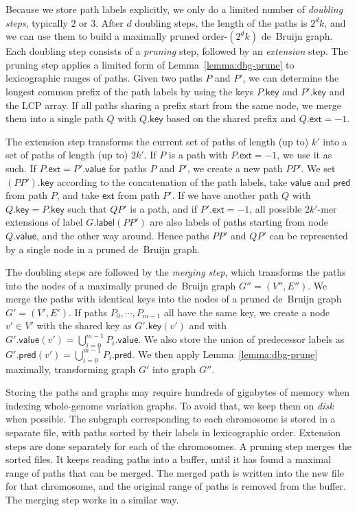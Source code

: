 \documentclass[twoside,leqno,twocolumn]{article}
\newcommand{\glabel}{\ensuremath{\mathsf{label}}}
\newcommand{\gpred}{\ensuremath{\mathsf{pred}}}
\newcommand{\gkey}{\ensuremath{\mathsf{key}}}
\newcommand{\gvalue}{\ensuremath{\mathsf{value}}}
\newcommand{\gext}{\ensuremath{\mathsf{ext}}}
\newcommand{\kmer}[1]{$#1$\nobreakdash-mer}
\newcommand{\orderk}[1]{order\nobreakdash-$#1$}
\begin{document}
Because we store path labels explicitly, we only do a limited number of \emph{doubling steps}, typically $2$ or $3$. After $d$ doubling steps, the length of the paths is $2^{d} k$, and we can use them to build a maximally pruned \orderk{(2^{d} k)} de~Bruijn graph. Each doubling step consists of a \emph{pruning} step, followed by an \emph{extension} step. The pruning step applies a limited form of Lemma~\ref{lemma:dbg-prune} to lexicographic ranges of paths. Given two paths $P$ and $P'$, we can determine the longest common prefix of the path labels by using the keys $P.\gkey$ and $P'.\gkey$ and the LCP array. If all paths sharing a prefix start from the same node, we merge them into a single path $Q$ with $Q.\gkey$ based on the shared prefix and $Q.\gext = -1$.

The extension step transforms the current set of paths of length (up to) $k'$ into a set of paths of length (up to) $2k'$. If $P$ is a path with $P.\gext = -1$, we use it as such. If $P.\gext = P'.\gvalue$ for paths $P$ and $P'$, we create a new path $PP'$. We set $(PP').\gkey$ according to the concatenation of the path labels, take $\gvalue$ and $\gpred$ from path $P$, and take $\gext$ from path $P'$. If we have another path $Q$ with $Q.\gkey = P.\gkey$ such that $QP'$ is a path, and if $P'.\gext = -1$, all possible \kmer{2k'} extensions of label $G.\glabel(PP')$ are also labels of paths starting from node $Q.\gvalue$, and the other way around. Hence paths $PP'$ and $QP'$ can be represented by a single node in a pruned de~Bruijn graph.

The doubling steps are followed by the \emph{merging step}, which transforms the paths into the nodes of a maximally pruned de~Bruijn graph $G'' = (V'', E'')$. We merge the paths with identical keys into the nodes of a pruned de~Bruijn graph $G' = (V', E')$. If paths $P_{0}, \dotsm, P_{m-1}$ all have the same key, we create a node $v' \in V'$ with the shared key as $G'.\gkey(v')$ and with $G'.\gvalue(v') = \bigcup_{i=0}^{m-1} P_{i}.\gvalue$. We also store the union of predecessor labels as $G'.\gpred(v') = \bigcup_{i=0}^{m-1} P_{i}.\gpred$. We then apply Lemma~\ref{lemma:dbg-prune} maximally, transforming graph $G'$ into graph $G''$.

Storing the paths and graphs may require hundreds of gigabytes of memory when indexing whole-genome variation graphs. To avoid that, we keep them on \emph{disk} when possible. The subgraph corresponding to each chromosome is stored in a separate file, with paths sorted by their labels in lexicographic order. Extension steps are done separately for each of the chromosomes. A pruning step merges the sorted files. It keeps reading paths into a buffer, until it has found a maximal range of paths that can be merged. The merged path is written into the new file for that chromosome, and the original range of paths is removed from the buffer. The merging step works in a similar way.
\end{document}
